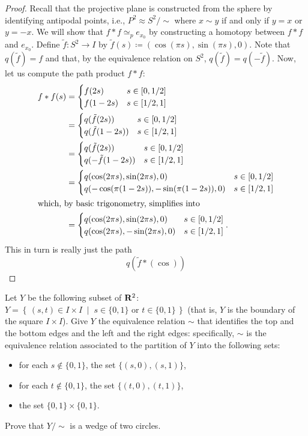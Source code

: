 \begin{proof}
Recall that the projective plane is constructed from the sphere by
identifying antipodal points, i.e., $P^2\approx S^2/{\sim}$ where $x\sim y$
if and only if $y=x$ or $y=-x$. We will show that $f*f\simeq_p e_{x_0}$ by
constructing a homotopy between $f*f$ and $e_{x_0}$. Define $\tilde f\colon
S^2\to I$ by $\tilde f(s)\coloneqq(\cos(\pi s),\sin(\pi s),0)$. Note that
$q(\tilde f)=f$ and that, by the equivalence relation on $S^2$, $q(\tilde
f)=q(-\tilde f)$. Now, let us compute the path product $f*f$:
\begin{align*}
f*f(s)&=
\begin{cases}
f(2s)&s\in[0,1/2]\\
f(1-2s)&s\in[1/2,1]
\end{cases}\\
&=
\begin{cases}
q(\tilde f(2s))&s\in[0,1/2]\\
q(\tilde f(1-2s))&s\in[1/2,1]
\end{cases}\\
&=
\begin{cases}
q(\tilde f(2s))&s\in[0,1/2]\\
q(-\tilde f(1-2s))&s\in[1/2,1]
\end{cases}\\
&=
\begin{cases}
q(\cos(2\pi s),\sin(2\pi s),0)&s\in[0,1/2]\\
q(-\cos(\pi(1-2s)),-\sin(\pi(1-2s)),0)&s\in[1/2,1]
\end{cases}\\
\intertext{which, by basic trigonometry, simplifies into}
&=
\begin{cases}
q(\cos(2\pi s),\sin(2\pi s),0)&s\in[0,1/2]\\
q(\cos(2\pi s),-\sin(2\pi s),0)&s\in[1/2,1]
\end{cases}.\\
\end{align*}
This in turn is really just the path
\[
q(\tilde f*(\cos))
\]
\end{proof}
\newpage
\begin{problem}[C]
Let $Y$ be the following subset of $\mathbf{R}^2$: $Y=\left\{\,(s,t)\in
  I\times I\;\middle|\;\text{$s\in\{0,1\}$ or
    $t\in\{0,1\}$}\,\right\}$ (that is, $Y$ is the boundary of
the square $I\times I$). Give $Y$ the equivalence relation $\sim$
that identifies the top and the bottom edges and the left and the
right edges: specifically, $\sim$ is the equivalence relation
associated to the partition of $Y$ into the following sets:
\begin{itemize}
\item for each $s\notin\{0,1\}$, the set $\{(s,0),(s,1)\}$,
\item for each $t\notin\{0,1\}$, the set $\{(t,0),(t,1)\}$,
\item the set $\{0,1\}\times\{0,1\}$.
\end{itemize}
Prove that $Y/{\sim}$ is a wedge of two circles.
\end{problem}
